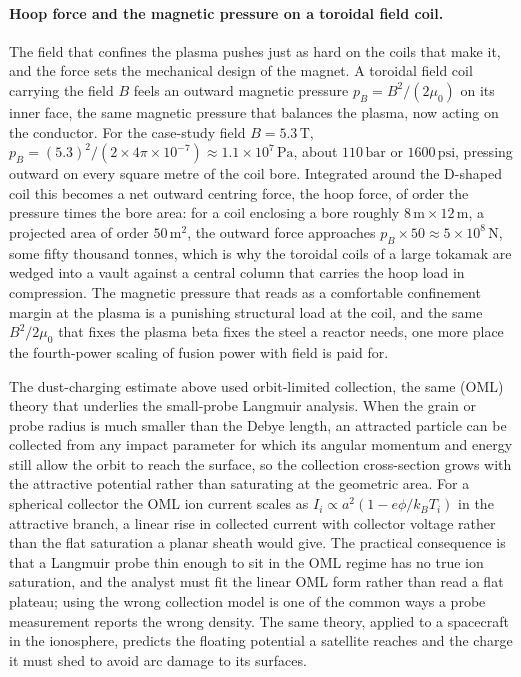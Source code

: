 \paragraph{Hoop force and the magnetic pressure on a toroidal field coil.}
The field that confines the plasma pushes just as hard on the coils that make
it, and the force sets the mechanical design of the magnet. A toroidal field
coil carrying the field $B$ feels an outward magnetic pressure $p_B = B^{2}/
(2\mu_0)$ on its inner face, the same magnetic pressure that balances the
plasma, now acting on the conductor. For the case-study field $B = 5.3\,\si{
\tesla}$, $p_B = (5.3)^{2}/(2\times 4\pi\times 10^{-7}) \approx 1.1\times
10^{7}\,\si{\pascal}$, about $110\,\text{bar}$ or $1600\,\text{psi}$, pressing
outward on every square metre of the coil bore. Integrated around the D-shaped
coil this becomes a net outward centring force, the hoop force, of order the
pressure times the bore area: for a coil enclosing a bore roughly $8\,\si{\meter}
\times 12\,\si{\meter}$, a projected area of order $50\,\si{\meter\squared}$,
the outward force approaches $p_B\times 50 \approx 5\times 10^{8}\,\si{\newton}$,
some fifty thousand tonnes, which is why the toroidal coils of a large tokamak
are wedged into a vault against a central column that carries the hoop load in
compression. The magnetic pressure that reads as a comfortable confinement
margin at the plasma is a punishing structural load at the coil, and the same
$B^{2}/2\mu_0$ that fixes the plasma beta fixes the steel a reactor needs, one
more place the fourth-power scaling of fusion power with field is paid for.

\begin{mastery}
The dust-charging estimate above used orbit-limited collection, the same
 (OML) theory that underlies the
small-probe Langmuir analysis. When the grain or probe radius is much
smaller than the Debye length, an attracted particle can be collected from
any impact parameter for which its angular momentum and energy still allow
the orbit to reach the surface, so the collection cross-section grows with
the attractive potential rather than saturating at the geometric area. For
a spherical collector the OML ion current scales as $I_i \propto a^{2}(1 -
e\phi/k_B T_i)$ in the attractive branch, a linear rise in collected
current with collector voltage rather than the flat saturation a planar
sheath would give. The practical consequence is that a Langmuir probe thin
enough to sit in the OML regime has no true ion saturation, and the
analyst must fit the linear OML form rather than read a flat plateau; using
the wrong collection model is one of the common ways a probe measurement
reports the wrong density. The same theory, applied to a spacecraft in the
ionosphere, predicts the floating potential a satellite reaches and the
charge it must shed to avoid arc damage to its surfaces.
\end{mastery}

